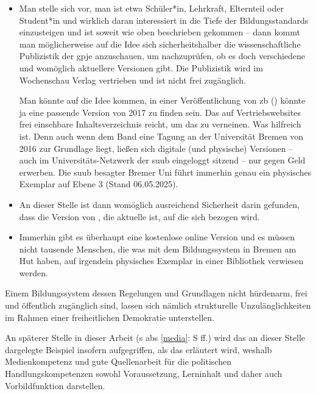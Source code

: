 \begin{itemize}
    \item Man stelle sich vor, man ist etwa Schüler*in, Lehrkraft, Elternteil oder Student*in und wirklich daran interessiert in die Tiefe der Bildungsstandards einzusteigen und ist soweit wie oben beschrieben gekommen -- dann kommt man möglicherweise auf die Idee sich sicherheitshalber die wissenschaftliche Publizistik der \gls{gpje} anzuschauen, um nachzuprüfen, ob es doch verschiedene und womöglich aktuellere Versionen gibt. Die Publizistik wird im Wochenschau Verlag vertrieben und ist nicht frei zugänglich. 
    
    Man könnte auf die Idee kommen, in einer Veröffentlichung von \citeyear{Gortler.2017} \gls{zb} (\citeauthor{Gortler.2017}) könnte ja eine passende Version von 2017 zu finden sein. Das auf Vertriebswebsites frei einsehbare Inhaltsverzeichnis reicht, um das zu verneinen. Was hilfreich ist. Denn auch wenn dem Band eine Tagung an der Universität Bremen von 2016 zur Grundlage liegt, ließen sich digitale (und physische) Versionen -- auch im Universitäts-Netzwerk der \gls{suub} eingeloggt sitzend -- nur gegen Geld erwerben. Die \gls{suub} besagter Bremer Uni führt immerhin genau ein physisches Exemplar auf Ebene 3 (Stand 06.05.2025). 

    \item An dieser Stelle ist dann womöglich ausreichend Sicherheit darin gefunden, dass die Version von \citeyear{gpje2004}, die aktuelle ist, auf die sich bezogen wird.

    \item Immerhin gibt es überhaupt eine kostenlose online Version und es müssen nicht tausende Menschen, die was mit dem Bildungssystem in Bremen am Hut haben, auf irgendein physisches Exemplar in einer Bibliothek verwiesen werden. %
\end{itemize}
Einem Bildungssystem dessen Regelungen und Grundlagen nicht hürdenarm, frei und öffentlich zugänglich sind, lassen sich nämlich strukturelle Unzulänglichkeiten im Rahmen einer freiheitlichen Demokratie unterstellen. 

An späterer Stelle in dieser Arbeit (\gls{s} \gls{abs} \ref{media}: \gls{S} \pageref{media}ff.) wird das an dieser Stelle dargelegte Beispiel insofern aufgegriffen, als das erläutert wird, weshalb Medienkompetenz und gute Quellenarbeit für die politischen Handlungskompetenzen sowohl Voraussetzung, Lerninhalt und daher auch Vorbildfunktion darstellen.

